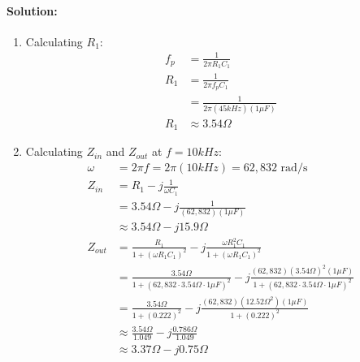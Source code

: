 \paragraph{Solution:}
\begin{enumerate}
  \item Calculating \(R_1\):
    \begin{align*}
      f_p &= \frac{1}{2 \pi R_1 C_1} \\
      R_1 &= \frac{1}{2 \pi f_p C_1} \\
      &= \frac{1}{2 \pi (45kHz)(1\mu F)} \\
      R_1 &\approx 3.54 \Omega
    \end{align*}
  \item Calculating \(Z_{in}\) and \(Z_{out}\) at \(f = 10kHz\):
    \begin{align*}
      \omega &= 2 \pi f = 2 \pi (10kHz) = 62,832 \text{ rad/s} \\
      Z_{in} &= R_1 - j \frac{1}{\omega C_1} \\
             &= 3.54 \Omega - j \frac{1}{(62,832)(1\mu F)} \\
             &\approx 3.54 \Omega - j 15.9 \Omega \\
      Z_{out} &= \frac{R_1}{1 + (\omega R_1 C_1)^2} - j \frac{\omega R_1^2 C_1}{1 + (\omega R_1 C_1)^2} \\
              &= \frac{3.54 \Omega}{1 + (62,832 \cdot 3.54 \Omega \cdot 1\mu F)^2} - j \frac{(62,832)(3.54 \Omega)^2 (1\mu F)}{1 + (62,832 \cdot 3.54 \Omega \cdot 1\mu F)^2} \\
              &= \frac{3.54 \Omega}{1 + (0.222)^2} - j \frac{(62,832)(12.52 \Omega^2)(1\mu F)}{1 + (0.222)^2} \\
              &\approx \frac{3.54 \Omega}{1.049} - j \frac{0.786 \Omega}{1.049} \\
              &\approx 3.37 \Omega - j 0.75 \Omega
    \end{align*}
\end{enumerate}
